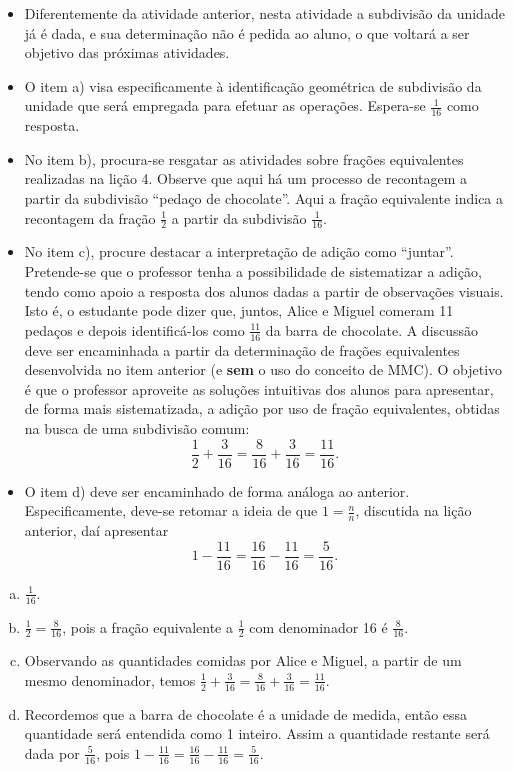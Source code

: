 \begin{multicols}{2}
\begin{orientacoes}
\begin{itemize} %
  \item      Diferentemente da atividade anterior, nesta atividade a subdivisão da unidade já é dada, e sua determinação não é pedida ao aluno, o que voltará a ser objetivo das próximas atividades.
  \item      O item a) visa especificamente à identificação geométrica de subdivisão da unidade que será empregada para efetuar as operações. Espera-se     $\frac{1}{16}$     como resposta.
  \item     No item b), procura-se resgatar as atividades sobre frações equivalentes realizadas na lição 4. Observe que aqui há um processo de recontagem a partir da subdivisão ``pedaço de chocolate''. Aqui a fração equivalente indica a recontagem da fração $\frac{1}{2}$ a partir da subdivisão $\frac{1}{16}$.
  \item  No item c), procure destacar a interpretação de adição como ``juntar''. Pretende-se que o professor tenha a possibilidade de sistematizar a adição, tendo como apoio a resposta dos alunos dadas a partir de observações visuais. Isto é, o estudante pode dizer que, juntos, Alice e Miguel comeram 11 pedaços e depois identificá-los como $\frac{11}{16}$ da barra de chocolate. A discussão deve ser encaminhada a partir da determinação de frações equivalentes desenvolvida no item anterior (e {\bf sem} o uso do conceito de MMC). O objetivo é que o professor aproveite as soluções intuitivas dos alunos para apresentar, de forma mais sistematizada, a adição por uso de fração equivalentes, obtidas na busca de uma subdivisão comum:
$$\frac{1}{2} + \frac{3}{16} = \frac{8}{16} + \frac{3}{16} = \frac{11}{16}.$$
  \item  O item d) deve ser encaminhado de forma análoga ao anterior. Especificamente, deve-se retomar a ideia de que $1 = \frac{n}{n}$, discutida na lição anterior, daí apresentar $$1 - \frac{11}{16} =  \frac{16}{16} - \frac{11}{16} = \frac{5}{16}.$$
\end{itemize} %
\end{orientacoes}
\newpage

\begin{solucao}{}{}
    \begin{enumerate}[a)]
     \item $\frac{1}{16}$.
     \item $\frac{1}{2}=\frac{8}{16}$, pois a fração equivalente a $\frac{1}{2}$ com denominador 16 é $\frac{8}{16}$.
     \item Observando as quantidades comidas por Alice e Miguel, a partir de um mesmo denominador, temos $\frac{1}{2}+\frac{3}{16} = \frac{8}{16} + \frac{3}{16} = \frac{11}{16}$.
     \item Recordemos que a barra de chocolate é a unidade de medida, então essa quantidade será entendida como 1 inteiro. Assim a quantidade restante será dada por $\frac{5}{16}$, pois $1 - \frac{11}{16} = \frac{16}{16} - \frac{11}{16} = \frac{5}{16}$.
    \end{enumerate}
  \end{solucao}


\end{multicols}
